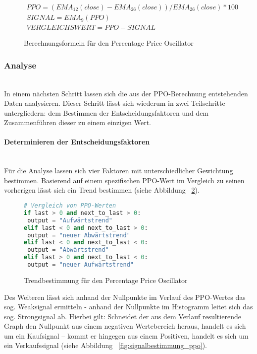 \begin{figure}[!ht]
\begin{gather*} 
PPO = ( EMA_{12}(close) - EMA_{26}(close) ) / EMA_{26}(close) * 100 \\ 
SIGNAL =  EMA_9( PPO )\\
VERGLEICHSWERT = PPO - SIGNAL
\end{gather*}
\caption{Berechnungsformeln für den Percentage Price Oscillator \cite{tvWikiPpo}}
\label{fig:formular_ppo}
\end{figure}

\subsubsection{Analyse\nopunct}~\\
\label{subsec_analysis_ppo}In einem nächsten Schritt lassen sich die aus der PPO-Berechnung entstehenden Daten analysieren. Dieser Schritt lässt sich wiederum in zwei Teilschritte untergliedern: dem Bestimmen der Entscheidungsfaktoren und dem Zusammenführen dieser zu einem einzigen Wert.

\paragraph{Determinieren der Entscheidungsfaktoren\nopunct}~\\
\label{subsubsec_analysis_calc_ppo}Für die Analyse lassen sich vier Faktoren mit unterschiedlicher Gewichtung bestimmen. Basierend auf einem spezifischen PPO-Wert im Vergleich zu seinen vorherigen lässt sich ein Trend bestimmen (siehe Abbildung ~\ref{fig:trendbestimmung_ppo}).

\begin{figure}[!ht]
\begin{lstlisting}[language=Python]
# Vergleich von PPO-Werten
if last > 0 and next_to_last > 0:
 output = "Aufwärtstrend"
elif last < 0 and next_to_last > 0:
 output = "neuer Abwärtstrend"
elif last < 0 and next_to_last < 0:
 output = "Abwärtstrend"
elif last > 0 and next_to_last < 0:
 output = "neuer Aufwärtstrend"
\end{lstlisting}
\caption{Trendbestimmung für den Percentage Price Oscillator}
\label{fig:trendbestimmung_ppo}
\end{figure}

Des Weiteren lässt sich anhand der Nullpunkte im Verlauf des PPO-Wertes das sog. Weaksignal ermitteln - anhand der Nullpunkte im Histogramm leitet sich das sog. Strongsignal ab. Hierbei gilt: Schneidet der aus dem Verlauf resultierende Graph den Nullpunkt aus einem negativen Wertebereich heraus, handelt es sich um ein Kaufsignal -- kommt er hingegen aus einem Positiven, handelt es sich um ein Verkaufssignal (siehe Abbildung ~\ref{fig:signalbestimmung_ppo}). 

